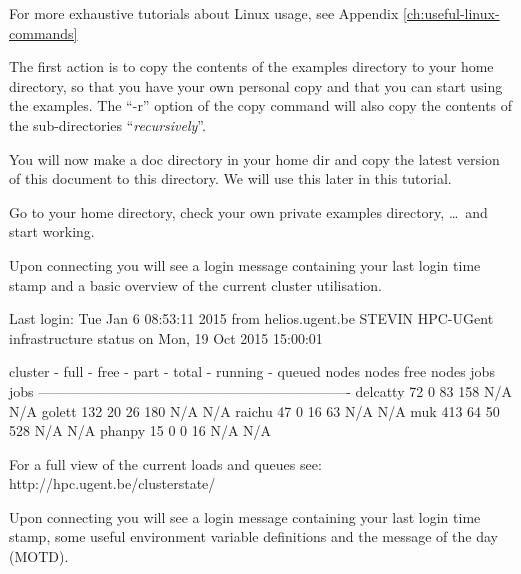 \begin{tip}
For more exhaustive tutorials about Linux usage, see Appendix \ref{ch:useful-linux-commands}
\end{tip}

The first action is to copy the contents of the \hpc examples directory
to your home directory, so that you have your own personal copy and that
you can start using the examples. The ``-r'' option of the copy command
will also copy the contents of the sub-directories ``\emph{recursively}''.

\begin{prompt}
\end{prompt}

\ifgent
You will now make a doc directory in your home dir and copy the latest version of this document to this directory. We will use this later in this tutorial.

\begin{prompt}
\end{prompt}

Go to your home directory, check your own private examples directory, \dots\
and start working.

\begin{prompt}
\end{prompt}

Upon connecting you will see a login message containing your last login
time stamp and a basic overview of the current cluster utilisation.

\begin{prompt}
Last login: Tue Jan  6 08:53:11 2015 from helios.ugent.be
STEVIN HPC-UGent infrastructure status on Mon, 19 Oct 2015 15:00:01

   cluster - full - free -  part - total - running - queued
             nodes  nodes   free   nodes    jobs      jobs
-------------------------------------------------------------------
  delcatty     72      0     83     158      N/A       N/A
    golett    132     20     26     180      N/A       N/A
    raichu     47      0     16      63      N/A       N/A
       muk    413     64     50     528      N/A       N/A
    phanpy     15      0      0      16      N/A       N/A

For a full view of the current loads and queues see:
 http://hpc.ugent.be/clusterstate/

\end{prompt}
\fi %
%
\ifbrussel
Upon connecting you will see a login message containing your last login
time stamp, some useful environment variable definitions and the message of the
day (MOTD).


